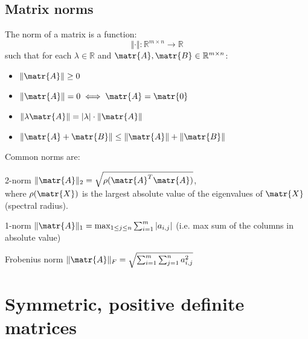\subsection{Matrix norms}
The norm of a matrix is a function: 
\begin{equation*}
    \Vert \cdot \Vert: \mathbb{R}^{m \times n} \rightarrow \mathbb{R}
\end{equation*}
such that for each $\lambda \in \mathbb{R}$ and $\matr{A}, \matr{B} \in \mathbb{R}^{m \times n}$:
\begin{itemize}
    \item $\Vert \matr{A} \Vert \geq 0$
    \item $\Vert \matr{A} \Vert = 0 \iff \matr{A} = \matr{0}$
    \item $\Vert \lambda \matr{A} \Vert = \vert \lambda \vert \cdot \Vert \matr{A} \Vert$
    \item $\Vert \matr{A} + \matr{B} \Vert \leq \Vert \matr{A} \Vert + \Vert \matr{B} \Vert$
\end{itemize}
%
Common norms are:
\begin{descriptionlist}
    \item[2-norm] 
        $\Vert \matr{A} \Vert_2 = \sqrt{ \rho(\matr{A}^T\matr{A}) }$,\\
        where $\rho(\matr{X})$ is the largest absolute value of the eigenvalues of $\matr{X}$ (spectral radius).
    
    \item[1-norm] $\Vert \matr{A} \Vert_1 = \max_{1 \leq j \leq n} \sum_{i=1}^{m} \vert a_{i,j} \vert$ (i.e. max sum of the columns in absolute value)
    
    \item[Frobenius norm] $\Vert \matr{A} \Vert_F = \sqrt{ \sum_{i=1}^{m} \sum_{j=1}^{n} a_{i,j}^2 }$
\end{descriptionlist}



\section{Symmetric, positive definite matrices}

